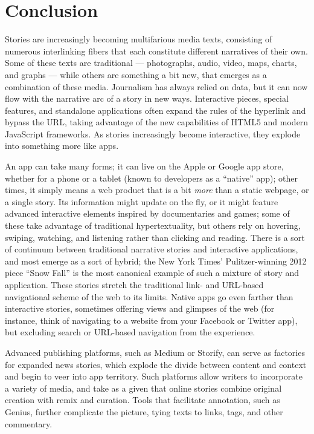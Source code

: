 \chapter{Conclusion}


Stories are increasingly becoming multifarious media texts, consisting of numerous interlinking fibers that each constitute different narratives of their own. Some of these texts are traditional --- photographs, audio, video, maps, charts, and graphs --- while others are something a bit new, that emerges as a combination of these media. Journalism has always relied on data, but it can now flow with the narrative arc of a story in new ways. Interactive pieces, special features, and standalone applications often expand the rules of the hyperlink and bypass the URL, taking advantage of the new capabilities of HTML5 and modern JavaScript frameworks. As stories increasingly become interactive, they explode into something more like apps.

An app can take many forms; it can live on the Apple or Google app store, whether for a phone or a tablet (known to developers as a ``native'' app); other times, it simply means a web product that is a bit \emph{more} than a static webpage, or a single story. Its information might update on the fly, or it might feature advanced interactive elements inspired by documentaries and games; some of these take advantage of traditional hypertextuality, but others rely on hovering, swiping, watching, and listening rather than clicking and reading. There is a sort of continuum between traditional narrative stories and interactive applications, and most emerge as a sort of hybrid; the New York Times' Pulitzer-winning 2012 piece ``Snow Fall'' is the most canonical example of such a mixture of story and application. These stories stretch the traditional link- and URL-based navigational scheme of the web to its limits. Native apps go even farther than interactive stories, sometimes offering views and glimpses of the web (for instance, think of navigating to a website from your Facebook or Twitter app), but excluding search or URL-based navigation from the experience.

Advanced publishing platforms, such as Medium or Storify, can serve as factories for expanded news stories, which explode the divide between content and context and begin to veer into app territory. Such platforms allow writers to incorporate a variety of media, and take as a given that online stories combine original creation with remix and curation. Tools that facilitate annotation, such as Genius, further complicate the picture, tying texts to links, tags, and other commentary.

